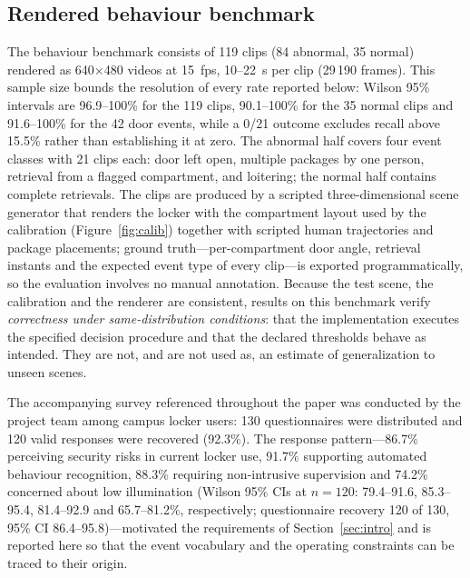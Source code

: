 \documentclass[journal,article,submit,oneauthor]{Definitions/mdpi}
\begin{document}
\subsection{Rendered behaviour benchmark}
\label{sec:bench}
The behaviour benchmark consists of 119 clips (84 abnormal, 35 normal) rendered as
640$\times$480 videos at 15~fps, 10--22~s per clip (29\,190 frames). This sample size
bounds the resolution of every rate reported below: Wilson 95\% intervals are 96.9--100\%
for the 119 clips, 90.1--100\% for the 35 normal clips and 91.6--100\% for the 42 door
events, while a 0/21 outcome excludes recall above 15.5\% rather than establishing it at zero. The abnormal half
covers four event classes with 21 clips each: door left open, multiple packages by one
person, retrieval from a flagged compartment, and loitering; the normal half contains
complete retrievals. The clips are produced by a scripted three-dimensional scene
generator that renders the locker with the compartment layout used by the calibration
(Figure~\ref{fig:calib}) together with scripted human trajectories and package placements;
ground truth---per-compartment door angle, retrieval instants and the expected event type of
every clip---is exported programmatically, so the evaluation involves no manual annotation.
Because the test scene, the calibration and the renderer are consistent, results on this
benchmark verify \emph{correctness under same-distribution conditions}: that the
implementation executes the specified decision procedure and that the declared thresholds
behave as intended. They are not, and are not used as, an estimate of generalization to
unseen scenes.

The accompanying survey referenced throughout the paper was conducted by the project team
among campus locker users: 130 questionnaires were distributed and 120 valid responses were
recovered (92.3\%). The response pattern---86.7\% perceiving security risks in current
locker use, 91.7\% supporting automated behaviour recognition, 88.3\% requiring
non-intrusive supervision and 74.2\% concerned about low illumination (Wilson 95\% CIs at
$n=120$: 79.4--91.6, 85.3--95.4, 81.4--92.9 and 65.7--81.2\%, respectively; questionnaire
recovery 120 of 130, 95\% CI 86.4--95.8)---motivated the
requirements of Section~\ref{sec:intro} and is reported here so that the event vocabulary
and the operating constraints can be traced to their origin.
\end{document}
